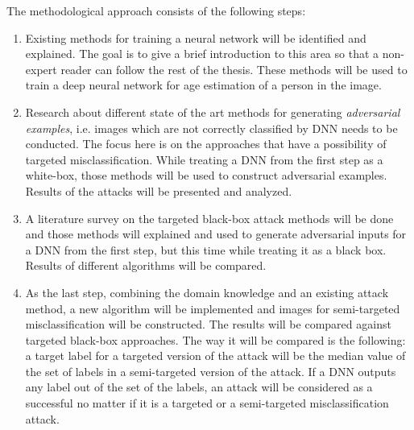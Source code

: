 The methodological approach consists of the following steps:
\begin{enumerate}
    \item Existing methods for training a neural network will be identified and explained. The goal is to give a brief introduction to this area so that a non-expert reader can follow the rest of the thesis. These methods will be used to train a deep neural network for age estimation of a person in the image.
    
    \item Research about different state of the art methods for generating \textit{adversarial examples}, i.e. images which are not correctly classified by DNN needs to be conducted. The focus here is on the approaches that have a possibility of targeted misclassification. While treating a DNN from the first step as a white-box, those methods will be used to construct adversarial examples. Results of the attacks will be presented and analyzed.
    
    \item A literature survey on the targeted black-box attack methods will be done and those methods will explained and used to generate adversarial inputs for a DNN  from the first step, but this time while treating it as a black box. Results of different algorithms will be compared. 
    
    \item As the last step, combining the domain knowledge and an existing attack method, a new algorithm will be implemented and images for semi-targeted misclassification will be constructed. The results will be compared against targeted black-box approaches. The way it will be compared is the following: a target label for a targeted version of the attack will be the median value of the set of labels in a semi-targeted version of the attack. If a DNN outputs any label out of the set of the labels, an attack will be considered as a successful no matter if it is a targeted or a semi-targeted misclassification attack.
\end{enumerate}

